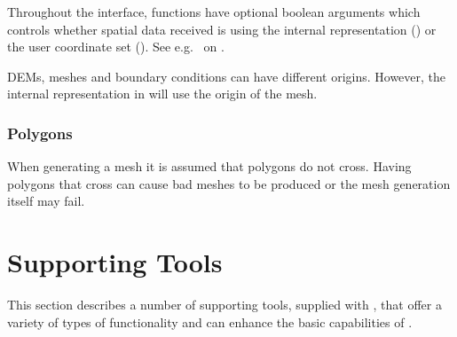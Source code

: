 \documentclass{manual}
\begin{document}
Throughout the \anuga interface, functions have optional boolean arguments  which controls
whether spatial data received is using the internal representation () or the 
user coordinate set (). See e.g.\  on \pageref{pg:get vertex coordinates}.

DEMs, meshes and boundary conditions can have different origins. However, the internal representation in \anuga 
will use the origin of the mesh.

\subsection{Polygons}
When generating a mesh it is assumed that polygons do not cross.
Having polygons that cross can cause bad meshes to be produced or the mesh generation itself may fail.

%
%
%
%
%
%
%
%
%


\appendix


\chapter{Supporting Tools}
\label{ch:supportingtools}

This section describes a number of supporting tools, supplied with \anuga, that offer a
variety of types of functionality and can enhance the basic capabilities of \anuga.
\end{document}
